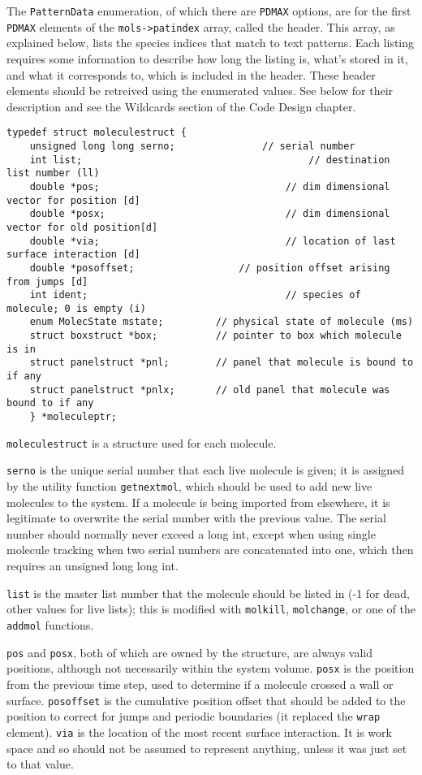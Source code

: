 \documentclass {book}
\begin{document}
The \texttt{PatternData} enumeration, of which there are \texttt{PDMAX} options, are for the first \texttt{PDMAX} elements of the \texttt{mols->patindex} array, called the header. This array, as explained below, lists the species indices that match to text patterns. Each listing requires some information to describe how long the listing is, what's stored in it, and what it corresponds to, which is included in the header. These header elements should be retreived using the enumerated values. See below for their description and see the Wildcards section of the Code Design chapter.

\begin{lstlisting}
typedef struct moleculestruct {
	unsigned long long serno;				// serial number
	int list;										// destination list number (ll)
	double *pos;								// dim dimensional vector for position [d]
	double *posx;								// dim dimensional vector for old position[d]
	double *via;								// location of last surface interaction [d]
	double *posoffset;					// position offset arising from jumps [d]
	int ident;									// species of molecule; 0 is empty (i)
	enum MolecState mstate;			// physical state of molecule (ms)
	struct boxstruct *box;			// pointer to box which molecule is in
	struct panelstruct *pnl;		// panel that molecule is bound to if any
	struct panelstruct *pnlx;		// old panel that molecule was bound to if any
	} *moleculeptr;
\end{lstlisting}

\texttt{moleculestruct} is a structure used for each molecule.

\texttt{serno} is the unique serial number that each live molecule is given; it is assigned by the utility function \texttt{getnextmol}, which should be used to add new live molecules to the system. If a molecule is being imported from elsewhere, it is legitimate to overwrite the serial number with the previous value. The serial number should normally never exceed a long int, except when using single molecule tracking when two serial numbers are concatenated into one, which then requires an unsigned long long int.

\texttt{list} is the master list number that the molecule should be listed in (-1 for dead, other values for live lists); this is modified with \texttt{molkill}, \texttt{molchange}, or one of the \texttt{addmol} functions.

\texttt{pos} and \texttt{posx}, both of which are owned by the structure, are always valid positions, although not necessarily within the system volume. \texttt{posx} is the position from the previous time step, used to determine if a molecule crossed a wall or surface. \texttt{posoffset} is the cumulative position offset that should be added to the position to correct for jumps and periodic boundaries (it replaced the \texttt{wrap} element). \texttt{via} is the location of the most recent surface interaction. It is work space and so should not be assumed to represent anything, unless it was just set to that value.
\end{document}
